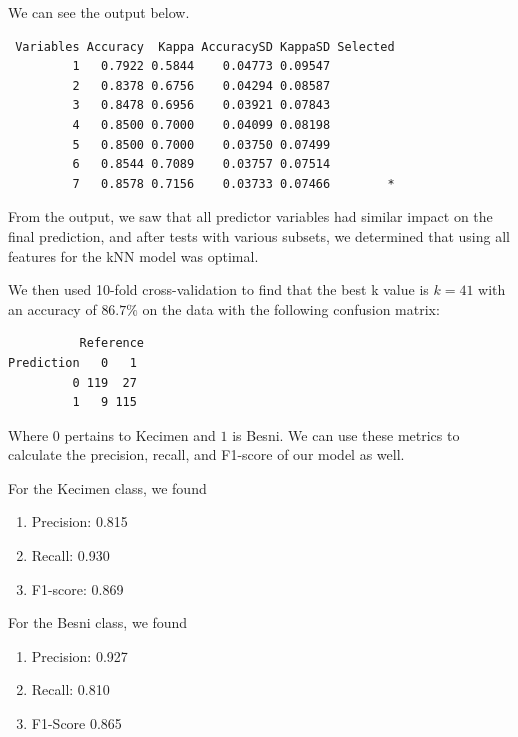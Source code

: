 \documentclass{article}
\begin{document}
We can see the output below.


\begin{verbatim}
 Variables Accuracy  Kappa AccuracySD KappaSD Selected
         1   0.7922 0.5844    0.04773 0.09547         
         2   0.8378 0.6756    0.04294 0.08587         
         3   0.8478 0.6956    0.03921 0.07843         
         4   0.8500 0.7000    0.04099 0.08198         
         5   0.8500 0.7000    0.03750 0.07499         
         6   0.8544 0.7089    0.03757 0.07514         
         7   0.8578 0.7156    0.03733 0.07466        *

\end{verbatim}

From the output, we saw that all predictor variables had similar impact on the final prediction, and after tests with various subsets, we determined that using all features for the kNN model was optimal.

We then used 10-fold cross-validation to find that the best k value is $k = 41$ with an accuracy of $86.7\%$ on the data with the following confusion matrix:

\begin{verbatim}
          Reference
Prediction   0   1
         0 119  27
         1   9 115
\end{verbatim}

Where $0$ pertains to Kecimen and $1$ is Besni. We can use these metrics to calculate the precision, recall, and F1-score of our model as well.

For the Kecimen class, we found

\begin{enumerate}
    \item Precision: 0.815

    \item Recall: 0.930

    \item F1-score: 0.869
\end{enumerate}

For the Besni class, we found

\begin{enumerate}
    \item Precision: 0.927

    \item Recall: 0.810

    \item F1-Score 0.865

\end{enumerate}
\end{document}
